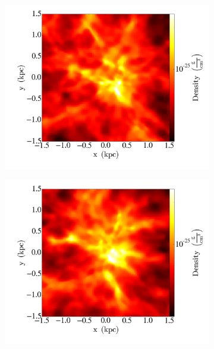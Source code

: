\documentclass[12pt,a4paper]{article}
\begin{document}
\begin{minipage}{\linewidth}

\end{minipage}

\begin{figure}
   \centering
   \begin{subfigure}[b]{0.48\textwidth}
       \includegraphics[width=\textwidth]{../kuvat/flythrough/0000.png}
   \end{subfigure}
   \begin{subfigure}[b]{0.48\textwidth}
       \includegraphics[width=\textwidth]{../kuvat/flythrough/0032.png}

\end{subfigure}
\end{figure}
\end{document}
